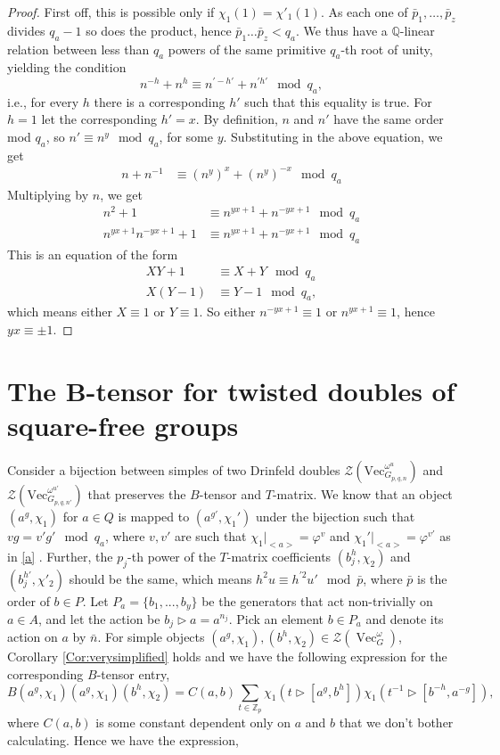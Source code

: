\documentclass[a4paper, 10pt]{book}
\theoremstyle{definition}
\numberwithin{equation}{chapter}
\newcommand\hit{\triangleright}
\newcommand\inv{^{-1}}
\newcommand\Vect{\operatorname{Vec}}
\newcommand\Q{\mathbb Q}
\newcommand\ZZ{\mathbb Z}
\newcommand\CTR{\mathcal Z}
\newcommand\coeff{C(a,b)}
\newcommand{\pb}{\bar{p}}
\newcommand{\qb}{q_a}
\newcommand{\nb}{\bar{n}}
\begin{document}
\begin{proof}
First off, this is possible only if $\chi_1(1) = \chi'_1(1)$. As each one of $\pb_1,\dots,\pb_z$ divides $q_a-1$ so does the product, hence $\pb_1\dots \pb_z < q_a$. We thus have a  $\Q$-linear relation between less than $\qb$ powers of the same primitive $\qb$-th root of unity, yielding the condition
\begin{equation*}
	n^{-h} +n^h \equiv n^{\prime-h'} +n^{\prime h'} \mod \qb,
\end{equation*} i.e., for every $h$ there is a corresponding $h'$ such that this equality is true. For $h=1$ let the corresponding $h'=x$.
	By definition,  $n$ and $n'$ have the same order mod $\qb$, so $n' \equiv n^y \mod \qb$, for some $y$. Substituting in the above equation, we get
	\begin{align} 
	n +n^{-1} &\equiv (n^y)^x +(n^y)^{-x} \mod \qb
	\end{align}
	Multiplying by $n$, we get 
	\begin{align}
		n^2 +1 &\equiv n^{yx+1} +n^{-yx+1} \mod \qb\\
		n^{yx+1}n^{-yx+1} +1 &\equiv n^{yx+1} +n^{-yx+1} \mod \qb
	\end{align}
	This is an equation of the form 
	\begin{align}
		XY + 1 &\equiv X + Y\mod \qb \\
		X(Y-1) &\equiv Y-1 \mod \qb,
	\end{align}
which means either $X\equiv1$ or $Y\equiv1$. So either $n^{-yx+1}\equiv1$ or $n^{yx+1}\equiv1$, hence $yx \equiv \pm 1$.
\end{proof}

\section{The B-tensor for twisted doubles of square-free groups}\label{squarefreeB}
Consider a bijection between simples of two Drinfeld doubles  $\mathcal{Z}(\text{Vec}^{\omega^u}_{G_{p, q, n}})$ and $\mathcal{Z}(\text{Vec}^{\omega^{u'}}_{G_{p,q,n'}})$ that preserves the $B$-tensor and $T$-matrix. We know that an object $(a^g, \chi_1)$ for $a\in Q$ is mapped to $(a^{g'}, \chi_1')$ under the bijection such that $vg = v'g' \mod q_a$, where $v, v'$ are such that $\chi_1|_{<a>} =\varphi^v$ and $\chi_1'|_{<a>}= \varphi^{v'}$ as in \ref{a} . Further, the $p_j$-th power of the $T$-matrix coefficients $(b_j^h, \chi_2)$ and $(b_j^{h'}, \chi'_2)$ should be the same, which means $h^2u\equiv h^{\prime 2}u'\mod \pb$, where $\pb$ is the order of $b\in P$. Let $ P_a = \{b_1,...,b_y\}$ be the generators that act non-trivially on $a\in A$, and let the action be  $b_j\hit a = a^{n_j}$. Pick an element $b\in P_a$ and denote its action on $a$ by $\nb$.  For simple objects $(a^g, \chi_1),(b^h, \chi_2) \in \CTR(\Vect^\omega_G)$, Corollary \ref{Cor:verysimplified} holds and we have the following expression for the corresponding $B$-tensor entry,	
\begin{equation*}
	B{(a^g, \chi_1)(a^g, \chi_1)(b^h,\chi_2)} = \coeff\sum_{t\in \ZZ_p} \chi_1(t \hit[a^g, b^h])\chi_1(t\inv \hit [b^{-h},  a^{-g}]),
\end{equation*}
where $\coeff$ is some constant dependent only on $a$ and $b$ that we don't bother calculating. Hence we have the expression,
\end{document}
